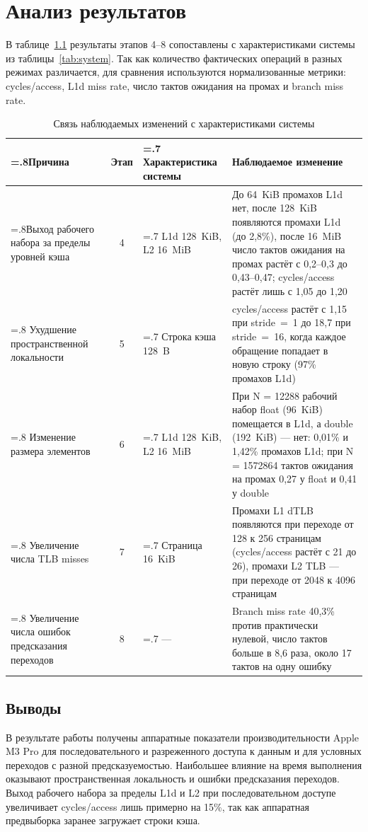 \chapter{Анализ результатов}
\label{ch:analysis}

В таблице~\ref{tab:summary} результаты этапов 4--8 сопоставлены с характеристиками системы из таблицы~\ref{tab:system}.
Так как количество фактических операций в разных режимах различается, для сравнения используются нормализованные метрики: cycles/access, L1d miss rate, число тактов ожидания на промах и branch miss rate.

\begin{table}[H]
\caption{Связь наблюдаемых изменений с характеристиками системы}
\label{tab:summary}
\small
\begin{tabularx}{\textwidth}{|>{\raggedright\arraybackslash\hsize=.8\hsize}X|c|>{\raggedright\arraybackslash\hsize=.7\hsize}X|>{\raggedright\arraybackslash\hsize=1.5\hsize}X|}
	\hline
	Причина & Этап & Характеристика системы & Наблюдаемое изменение \\
	\hline
	Выход рабочего набора за пределы уровней кэша & 4 & L1d 128~KiB, L2 16~MiB & До 64~KiB промахов L1d нет, после 128~KiB появляются промахи L1d (до 2,8\%), после 16~MiB число тактов ожидания на промах растёт с 0,2--0,3 до 0,43--0,47; cycles/access растёт лишь с 1,05 до 1,20 \\
	\hline
	Ухудшение пространственной локальности & 5 & Строка кэша 128~B & cycles/access растёт с 1,15 при stride~=~1 до 18,7 при stride~=~16, когда каждое обращение попадает в новую строку (97\% промахов L1d) \\
	\hline
	Изменение размера элементов & 6 & L1d 128~KiB, L2 16~MiB & При N = 12288 рабочий набор float (96~KiB) помещается в L1d, а double (192~KiB) --- нет: 0,01\% и 1,42\% промахов L1d; при N = 1572864 тактов ожидания на промах 0,27 у float и 0,41 у double \\
	\hline
	Увеличение числа TLB misses & 7 & Страница 16~KiB & Промахи L1 dTLB появляются при переходе от 128 к 256 страницам (cycles/access растёт с 21 до 26), промахи L2 TLB --- при переходе от 2048 к 4096 страницам \\
	\hline
	Увеличение числа ошибок предсказания переходов & 8 & --- & Branch miss rate 40,3\% против практически нулевой, число тактов больше в 8,6 раза, около 17 тактов на одну ошибку \\
	\hline
\end{tabularx}
\end{table}

\section{Выводы}

В результате работы получены аппаратные показатели производительности Apple M3 Pro для последовательного и разреженного доступа к данным и для условных переходов с разной предсказуемостью.
Наибольшее влияние на время выполнения оказывают пространственная локальность и ошибки предсказания переходов.
Выход рабочего набора за пределы L1d и L2 при последовательном доступе увеличивает cycles/access лишь примерно на 15\%, так как аппаратная предвыборка заранее загружает строки кэша.
